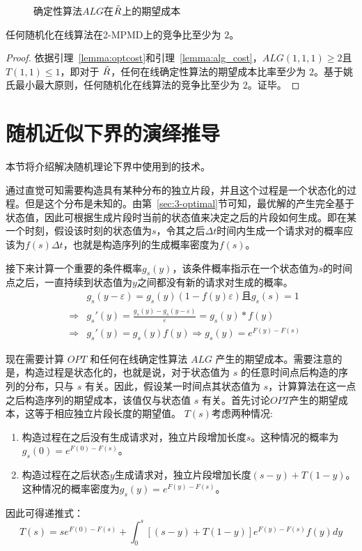 \begin{figure}[htp]
  \centering
  
  \caption{确定性算法$ALG$在$\tilde{R}$上的期望成本}
\end{figure}

\begin{theorem}
    任何随机化在线算法在2-MPMD上的竞争比至少为 $2$。
\end{theorem}

\begin{proof}
    依据引理~\ref{lemma:optcost}和引理~\ref{lemma:alg_cost}，$ALG(1,1,1)\geq2$且$T(1,1)\leq 1$，即对于 $\tilde{R}$，任何在线确定性算法的期望成本比率至少为 $2$。基于姚氏最小最大原则\cite{yao1977probabilistic}，任何随机化在线算法的竞争比至少为 $2$。证毕。
\end{proof}

\section{随机近似下界的演绎推导} \label{sec:3-formalization}
本节将介绍解决随机理论下界中使用到的技术。

通过直觉可知需要构造具有某种分布的独立片段，并且这个过程是一个状态化的过程。但是这个分布是未知的。由第~\ref{sec:3-optimal}节可知，最优解的产生完全基于状态值，因此可根据生成片段时当前的状态值来决定之后的片段如何生成。即在某一个时刻，假设该时刻的状态值为$s$，令其之后$\Delta t$时间内生成一个请求对的概率应该为$f(s)\Delta t$，也就是构造序列的生成概率密度为$f(s)$。

接下来计算一个重要的条件概率$g_s(y)$，该条件概率指示在一个状态值为$s$的时间点之后，一直持续到状态值为$y$之间都没有新的请求对生成的概率。
\begin{align*}
& & g_s(y-\varepsilon) = g_s(y)(1-f(y)\varepsilon) \text{且} g_s(s) = 1\\
& \Rightarrow & g_s'(y) = \frac{g_s(y) - g_s(y-\varepsilon)}{\varepsilon} = g_s(y) * f(y)\\
& \Rightarrow & g_s'(y) = g_s(y)f(y) \Rightarrow g_s(y) = e^{F(y)-F(s)}
\end{align*}

现在需要计算 $OPT$ 和任何在线确定性算法 $ALG$ 产生的期望成本。需要注意的是，构造过程是状态化的，也就是说，对于状态值为 $s$ 的任意时间点后构造的序列的分布，只与 $s$ 有关。因此，假设某一时间点其状态值为 $s$，计算算法在这一点之后构造序列的期望成本，该值仅与状态值 $s$ 有关。首先讨论$OPT$产生的期望成本，这等于相应独立片段长度的期望值。
$T(s)$考虑两种情况:
 \renewcommand{\labelenumi}{(\arabic{enumi})}
\begin{enumerate}[align=left, labelsep=-0.5em, itemindent=3.6em, leftmargin=0em]
    \item 构造过程在之后没有生成请求对，独立片段增加长度$s$。这种情况的概率为$g_s(0)=e^{F(0)-F(s)}$。
    \item 构造过程在之后状态$y$生成请求对，独立片段增加长度$(s-y) +T(1-y)$。这种情况的概率密度为$g_s(y)=e^{F(y)-F(s)}$。
\end{enumerate}
因此可得递推式：
\begin{equation}
    T(s)=s e^{F(0)-F(s)}+\int_0^s[(s-y)+T(1-y)] e^{F(y)-F(s)} f(y)dy
\end{equation}
    
